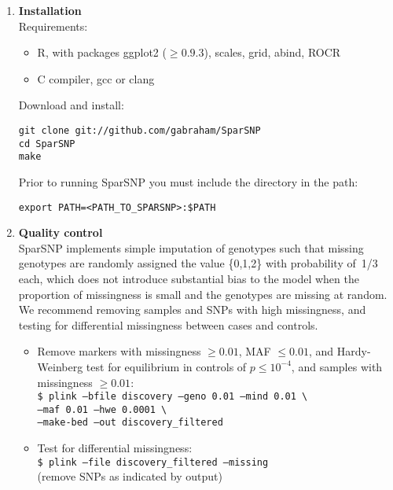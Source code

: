 \documentclass[a4paper,11pt]{article}
\begin{document}
\begin{enumerate}

   \item \textbf{Installation}\\

   Requirements:\\
   
      \begin{itemize}
	 \item \textsf{R}, with packages ggplot2 ($\ge 0.9.3$), scales, grid, abind, ROCR
	 \item C compiler, gcc or clang
      \end{itemize}

   Download and install:
\begin{verbatim}
git clone git://github.com/gabraham/SparSNP
cd SparSNP
make
\end{verbatim}

   Prior to running SparSNP you must include the directory in the path:
\begin{verbatim}
export PATH=<PATH_TO_SPARSNP>:$PATH
\end{verbatim}

   

   \item \textbf{Quality control}\\
      SparSNP implements simple imputation of genotypes such that missing
      genotypes are randomly assigned the value \{0,1,2\} with probability
      of~1/3 each, which does not introduce substantial bias to the model when
      the proportion of missingness is small and the genotypes are missing at
      random. We recommend removing samples and SNPs with high missingness,
      and testing for differential missingness between cases and controls.


      \begin{itemize}

      \item Remove markers with missingness $\ge 0.01$, MAF $\le 0.01$, and
      Hardy-Weinberg test for equilibrium in
      controls of $p\le 10^{-4}$, and samples with missingness $\ge 0.01$: \\
      \texttt{\$ plink --bfile discovery --geno 0.01 --mind 0.01
      \textbackslash \\ --maf 0.01 --hwe
      0.0001 \textbackslash \\
      --make-bed --out discovery\_filtered
      }

      \item Test for differential missingness: \\
      \texttt{\$ plink --file discovery\_filtered --missing} \\
      (remove SNPs as indicated by output)


\end{itemize}
\end{enumerate}
\end{document}
